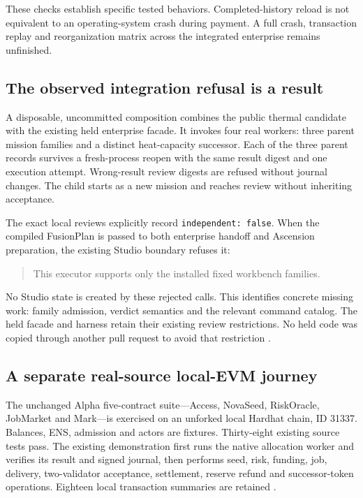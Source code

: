\documentclass[11pt,a4paper]{article}
\begin{document}
These checks establish specific tested behaviors. Completed-history reload is not equivalent to an operating-system crash during payment. A full crash, transaction replay and reorganization matrix across the integrated enterprise remains unfinished.

\subsection{The observed integration refusal is a result}
A disposable, uncommitted composition combines the public thermal candidate with the existing held enterprise facade. It invokes four real workers: three parent mission families and a distinct heat-capacity successor. Each of the three parent records survives a fresh-process reopen with the same result digest and one execution attempt. Wrong-result review digests are refused without journal changes. The child starts as a new mission and reaches review without inheriting acceptance.

The exact local reviews explicitly record \texttt{independent: false}. When the compiled FusionPlan is passed to both enterprise handoff and Ascension preparation, the existing Studio boundary refuses it:
\begin{quote}\sffamily
This executor supports only the installed fixed workbench families.
\end{quote}
No Studio state is created by these rejected calls. This identifies concrete missing work: family admission, verdict semantics and the relevant command catalog. The held facade and harness retain their existing review restrictions. No held code was copied through another pull request to avoid that restriction \cite{facadedata}.

\subsection{A separate real-source local-EVM journey}
The unchanged Alpha five-contract suite---Access, NovaSeed, RiskOracle, JobMarket and Mark---is exercised on an unforked local Hardhat chain, ID 31337. Balances, ENS, admission and actors are fixtures. Thirty-eight existing source tests pass. The existing demonstration first runs the native allocation worker and verifies its result and signed journal, then performs seed, risk, funding, job, delivery, two-validator acceptance, settlement, reserve refund and successor-token operations. Eighteen local transaction summaries are retained \cite{evmdata,ascensionsource}.
\end{document}
